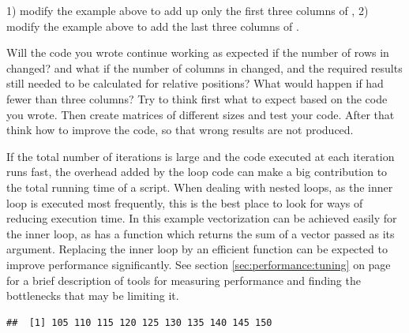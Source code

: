 \documentclass[krantz2]{krantz}\usepackage{knitr}%
\begin{document}
\begin{playground}
1) modify the example above to add up only the first three columns of , 2) modify the example above to add the last three columns of .

Will the code you wrote continue working as expected if the number of rows in  changed? and what if the number of columns in  changed, and the required results still needed to be calculated for relative positions? What would happen if  had fewer than three columns? Try to think first what to expect based on the code you wrote. Then create matrices of different sizes and test your code. After that think how to improve the code, so that wrong results are not produced.
\end{playground}

\begin{explainbox}
If the total number of iterations is large and the code executed at each iteration runs fast, the overhead added by the loop code can make a big contribution to the total running time of a script.
When dealing with nested loops, as the inner loop is executed most frequently, this is the best place to look for ways of reducing execution time. In this example vectorization can be achieved easily for the inner loop, as \Rlang has a function  which returns the sum of a vector passed as its argument. Replacing the inner loop by an efficient function can be expected to improve performance significantly. See section \ref{sec:performance:tuning} on page \pageref{sec:performance:tuning} for a brief description of tools for measuring performance and finding the bottlenecks that may be limiting it.

\begin{knitrout}\footnotesize
{}\color{fgcolor}\begin{kframe}
\begin{alltt}
 \hlkwb{<-} \hlstd{(} 
   \hlopt{:}
   \hlkwb{<-} 
\hlstd{\}}
\end{alltt}
\begin{verbatim}
##  [1] 105 110 115 120 125 130 135 140 145 150
\end{verbatim}
\end{kframe}
\end{knitrout}


\end{explainbox}
\end{document}

